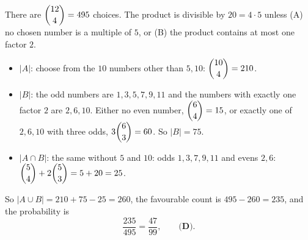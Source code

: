 There are $\dbinom{12}{4}=495$ choices. The product is divisible by $20=4\cdot5$ unless (A) no chosen number is a multiple of $5$, or (B) the product contains at most one factor $2$.
\begin{itemize}
\item $|A|$: choose from the $10$ numbers other than $5,10$: $\dbinom{10}{4}=210$.
\item $|B|$: the odd numbers are $1,3,5,7,9,11$ and the numbers with exactly one factor $2$ are $2,6,10$. Either no even number, $\dbinom64=15$, or exactly one of $2,6,10$ with three odds, $3\dbinom63=60$. So $|B|=75$.
\item $|A\cap B|$: the same without $5$ and $10$: odds $1,3,7,9,11$ and evens $2,6$: $\dbinom54+2\dbinom53=5+20=25$.
\end{itemize}
So $|A\cup B|=210+75-25=260$, the favourable count is $495-260=235$, and the probability is
\[
\dfrac{235}{495}=\boxed{\dfrac{47}{99}},\qquad\textbf{(D)}.
\]
